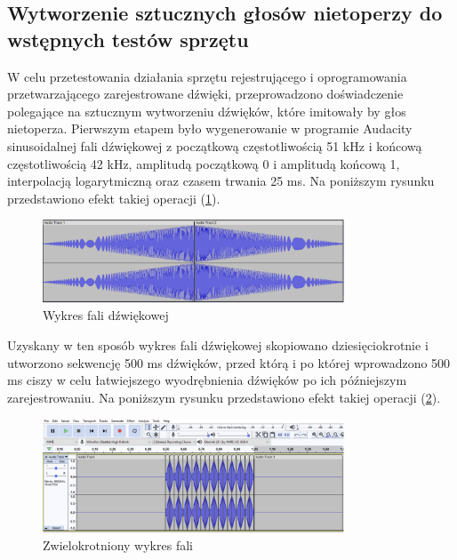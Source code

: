 \documentclass{sprz}
\begin{document}
\subsection{Wytworzenie sztucznych głosów nietoperzy do wstępnych testów sprzętu}

W celu przetestowania działania sprzętu rejestrującego i oprogramowania przetwarzającego zarejestrowane dźwięki, przeprowadzono doświadczenie polegające na sztucznym wytworzeniu dźwięków, które imitowały by głos nietoperza.
Pierwszym etapem było wygenerowanie w programie Audacity sinusoidalnej fali dźwiękowej z początkową częstotliwością 51 kHz i końcową częstotliwością 42 kHz, amplitudą początkową 0 i amplitudą końcową 1, interpolacją logarytmiczną oraz czasem trwania 25 ms. Na poniższym rysunku przedstawiono efekt takiej operacji (\ref{img:wykres_fali}).

\begin{figure}[h]
    \centering
    \includegraphics[width=0.8\textwidth]{sprz/wykres_fali}
    \caption{Wykres fali dźwiękowej}
    \label{img:wykres_fali}
\end{figure}

Uzyskany w ten sposób wykres fali dźwiękowej skopiowano dziesięciokrotnie i utworzono sekwencję 500 ms dźwięków, przed którą i po której wprowadzono 500 ms ciszy w celu łatwiejszego wyodrębnienia dźwięków po ich późniejszym zarejestrowaniu. Na poniższym rysunku przedstawiono efekt takiej operacji (\ref{img:wykres_fali_wielokrotnej}).

\begin{figure}[h]
    \centering
    \includegraphics[width=0.8\textwidth]{sprz/wykres_fali_wielokrotnej}
    \caption{Zwielokrotniony wykres fali}
    \label{img:wykres_fali_wielokrotnej}
\end{figure}
\end{document}
